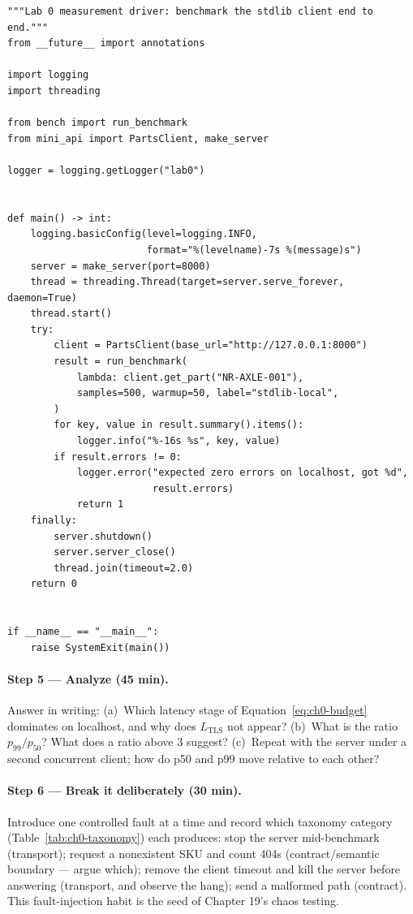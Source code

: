 \begin{verbatim}
"""Lab 0 measurement driver: benchmark the stdlib client end to end."""
from __future__ import annotations

import logging
import threading

from bench import run_benchmark
from mini_api import PartsClient, make_server

logger = logging.getLogger("lab0")


def main() -> int:
    logging.basicConfig(level=logging.INFO,
                        format="%(levelname)-7s %(message)s")
    server = make_server(port=8000)
    thread = threading.Thread(target=server.serve_forever, daemon=True)
    thread.start()
    try:
        client = PartsClient(base_url="http://127.0.0.1:8000")
        result = run_benchmark(
            lambda: client.get_part("NR-AXLE-001"),
            samples=500, warmup=50, label="stdlib-local",
        )
        for key, value in result.summary().items():
            logger.info("%-16s %s", key, value)
        if result.errors != 0:
            logger.error("expected zero errors on localhost, got %d",
                         result.errors)
            return 1
    finally:
        server.shutdown()
        server.server_close()
        thread.join(timeout=2.0)
    return 0


if __name__ == "__main__":
    raise SystemExit(main())
\end{verbatim}
\label{lst:ch0-labdriver}

\paragraph{Step 5 --- Analyze (45 min).}
Answer in writing: (a)~Which latency stage of
Equation~\eqref{eq:ch0-budget} dominates on localhost, and why does
$L_{\mathrm{TLS}}$ not appear? (b)~What is the ratio $p_{99}/p_{50}$? What
does a ratio above 3 suggest? (c)~Repeat with the server under a second
concurrent client; how do p50 and p99 move relative to each other?

\paragraph{Step 6 --- Break it deliberately (30 min).}
Introduce one controlled fault at a time and record which taxonomy category
(Table~\ref{tab:ch0-taxonomy}) each produces: stop the server mid-benchmark
(transport); request a nonexistent SKU and count 404s (contract/semantic
boundary --- argue which); remove the client timeout and kill the server
before answering (transport, and observe the hang); send a malformed path
(contract). This fault-injection habit is the seed of Chapter 19's chaos
testing.

